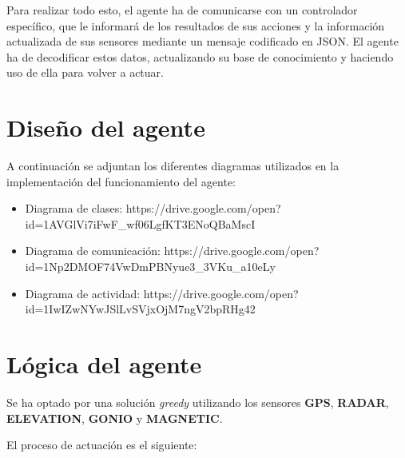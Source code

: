 \documentclass[11pt,a4paper]{article}
\begin{document}
Para realizar todo esto, el agente ha de comunicarse con un controlador específico, que le informará de los resultados de sus acciones y la información actualizada
de sus sensores mediante un mensaje codificado en JSON. El agente ha de decodificar estos datos, actualizando su base de conocimiento y haciendo uso de ella para 
volver a actuar.

\section{Diseño del agente}

A continuación se adjuntan los diferentes diagramas utilizados en la implementación del funcionamiento del agente:
\begin{itemize}
	\item Diagrama de clases: https://drive.google.com/open?id=1AVGlVi7iFwF_wf06LgfKT3ENoQBaMscI
	\item Diagrama de comunicación: https://drive.google.com/open?id=1Np2DMOF74VwDmPBNyue3_3VKu_a10eLy
	\item Diagrama de actividad: https://drive.google.com/open?id=1IwIZwNYwJSlLvSVjxOjM7ngV2bpRHg42
\end{itemize}

\section{Lógica del agente}

Se ha optado por una solución \textit{greedy} utilizando los sensores \textbf{GPS}, \textbf{RADAR}, \textbf{ELEVATION}, \textbf{GONIO} y \textbf{MAGNETIC}.

El proceso de actuación es el siguiente:
\end{document}
